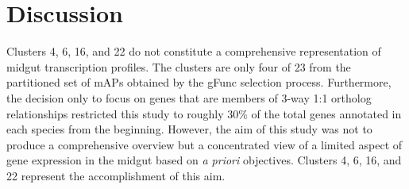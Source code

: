 \section{Discussion} \label{chap:4-sec:discussion}
















Clusters 4, 6, 16, and 22 do not constitute a comprehensive representation of midgut transcription profiles.
%
The clusters are only four of 23 from the partitioned set of \glspl{mAP} obtained by the \gls{gFunc} selection process.
%
Furthermore, the decision only to focus on genes that are members of 3-way 1:1 ortholog relationships restricted this study to roughly 30\% of the total genes annotated in each species from the beginning.
%
However, the aim of this study was not to produce a comprehensive overview but a concentrated view of a limited aspect of gene expression in the midgut based on \textit{a priori} objectives.
%
Clusters 4, 6, 16, and 22 represent the accomplishment of this aim.


